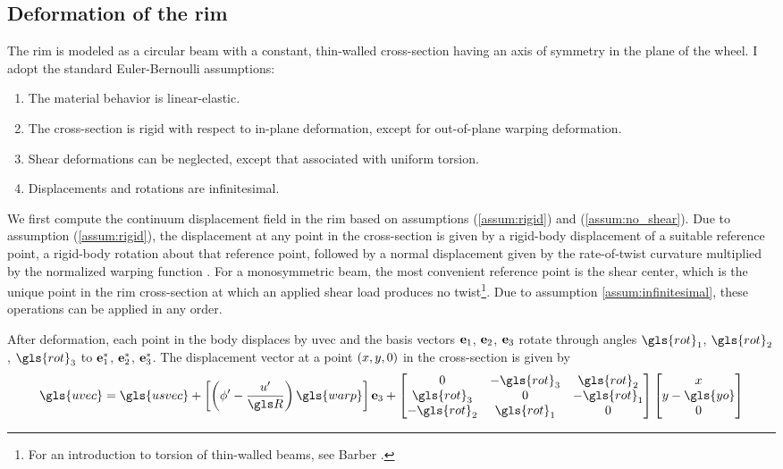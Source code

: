 \documentclass[\rootdir/thesis.tex]{subfiles}
\begin{document}
\subsection{Deformation of the rim}
\label{sec:rim_strain_energy}

The rim is modeled as a circular beam with a constant, thin-walled cross-section having an axis of symmetry in the plane of the wheel. I adopt the standard Euler-Bernoulli assumptions:

\begin{enumerate}
	\item{The material behavior is linear-elastic.}\label{assum:elastic}
	\item{The cross-section is rigid with respect to in-plane deformation, except for out-of-plane warping deformation.}\label{assum:rigid}
	\item{Shear deformations can be neglected, except that associated with uniform torsion.}\label{assum:no_shear}
	\item{Displacements and rotations are infinitesimal.}\label{assum:infinitesimal}
\end{enumerate}

We first compute the continuum displacement field in the rim based on assumptions (\ref{assum:rigid}) and (\ref{assum:no_shear}). Due to assumption (\ref{assum:rigid}), the displacement at any point in the cross-section is given by a rigid-body displacement of a suitable reference point, a rigid-body rotation about that reference point, followed by a normal displacement given by the rate-of-twist curvature multiplied by the normalized warping function \cite{warping mechanics}. For a monosymmetric beam, the most convenient reference point is the shear center, which is the unique point in the rim cross-section at which an applied shear load produces no twist\footnote{For an introduction to torsion of thin-walled beams, see Barber \cite{Barber2011}.}. Due to assumption \ref{assum:infinitesimal}, these operations can be applied in any order.

After deformation, each point in the body displaces by \gls{uvec} and the basis vectors $\mathbf{e}_1$, $\mathbf{e}_2$, $\mathbf{e}_3$ rotate through angles $\gls{rot}_1$, $\gls{rot}_2$, $\gls{rot}_3$ to $\mathbf{e}_1^*$, $\mathbf{e}_2^*$, $\mathbf{e}_3^*$. The displacement vector at a point $(x, y, 0)$ in the cross-section is given by
\begin{equation}
\label{eq:u}
\gls{uvec} = \gls{usvec} + \left[\left(\phi' - \frac{u'}{\R}\right)\gls{warp}\right]\eh +
\begin{bmatrix}
0        & -\gls{rot}_3& \gls{rot}_2\\
\gls{rot}_3 & 0        & -\gls{rot}_1\\
-\gls{rot}_2& \gls{rot}_1 & 0
\end{bmatrix}
\begin{bmatrix}\x\\\y - \gls{yo}\\0\end{bmatrix}
\end{equation}
\end{document}
